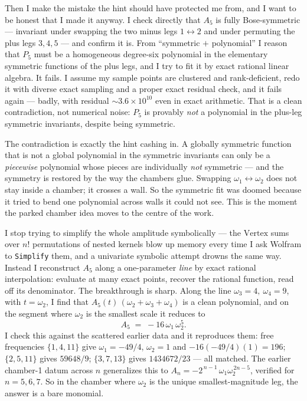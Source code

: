 \documentclass{article}
\begin{document}
Then I make the mistake the hint should have protected me from, and I want to be
honest that I made it anyway. I check directly that $A_5$ is fully Bose-symmetric
--- invariant under swapping the two minus legs $1\leftrightarrow2$ and under
permuting the plus legs $3,4,5$ --- and confirm it is. From ``symmetric $+$
polynomial'' I reason that $P_5$ must be a homogeneous degree-six polynomial in
the elementary symmetric functions of the plus legs, and I try to fit it by exact
rational linear algebra. It fails. I assume my sample points are clustered and
rank-deficient, redo it with diverse exact sampling and a proper exact residual
check, and it fails again --- badly, with residual $\sim 3.6\times10^{10}$ even in
exact arithmetic. That is a clean contradiction, not numerical noise: $P_5$ is
provably \emph{not} a polynomial in the plus-leg symmetric invariants, despite
being symmetric.

The contradiction is exactly the hint cashing in. A globally symmetric function
that is not a global polynomial in the symmetric invariants can only be a
\emph{piecewise} polynomial whose pieces are individually \emph{not} symmetric ---
and the symmetry is restored by the way the chambers glue. Swapping
$\omega_1\leftrightarrow\omega_2$ does not stay inside a chamber; it crosses a
wall. So the symmetric fit was doomed because it tried to bend one polynomial
across walls it could not see. This is the moment the parked chamber idea moves
to the centre of the work.

I stop trying to simplify the whole amplitude symbolically --- the
$\mathrm{Vertex}$ sums over $n!$ permutations of nested kernels blow up memory
every time I ask Wolfram to \texttt{Simplify} them, and a univariate symbolic
attempt drowns the same way. Instead I reconstruct $A_5$ along a one-parameter
\emph{line} by exact rational interpolation: evaluate at many exact points,
recover the rational function, read off its denominator. The breakthrough is
sharp. Along the line $\omega_3=4,\ \omega_4=9$, with $t=\omega_2$, I find that
$A_5(t)\,(\omega_2+\omega_3+\omega_4)$ is a clean polynomial, and on the segment
where $\omega_2$ is the smallest scale it reduces to
\[
A_5 \;=\; -16\,\omega_1\,\omega_2^{5}.
\]
I check this against the scattered earlier data and it reproduces them: free
frequencies $\{1,4,11\}$ give $\omega_1=-49/4$, $\omega_2=1$ and
$-16(-49/4)(1)=196$; $\{2,5,11\}$ gives $59648/9$; $\{3,7,13\}$ gives
$1434672/23$ --- all matched. The earlier chamber-1 datum across $n$ generalizes
this to $A_n=-2^{\,n-1}\,\omega_1\omega_2^{\,2n-5}$, verified for $n=5,6,7$. So in
the chamber where $\omega_2$ is the unique smallest-magnitude leg, the answer is a
bare monomial.
\end{document}

